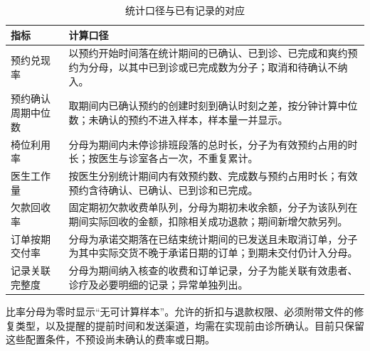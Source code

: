 \begin{table}[H]\centering\caption{统计口径与已有记录的对应}
\small\begin{tabularx}{\textwidth}{L{3.3cm}Y}
\toprule 指标 & 计算口径\\\midrule
预约兑现率 & 以预约开始时间落在统计期间的已确认、已到诊、已完成和爽约预约为分母，以其中已到诊或已完成数为分子；取消和待确认不纳入。\\
预约确认周期中位数 & 取期间内已确认预约的创建时刻到确认时刻之差，按分钟计算中位数；未确认的预约不进入样本，样本量一并显示。\\
椅位利用率 & 分母为期间内未停诊排班段落的总时长，分子为有效预约占用的时长；按医生与诊室各占一次，不重复累计。\\
医生工作量 & 按医生分别统计期间内有效预约数、完成数与预约占用时长；有效预约含待确认、已确认、已到诊和已完成。\\
欠款回收率 & 固定期初欠款收费单队列，分母为期初未收余额，分子为该队列在期间实际回收的金额，扣除相关成功退款；期间新增欠款另列。\\
订单按期交付率 & 分母为承诺交期落在已结束统计期间的已发送且未取消订单，分子为其中实际交货不晚于承诺日期的订单；到期未交付仍计入分母。\\
记录关联完整度 & 分母为期间纳入核查的收费和订单记录，分子为能关联有效患者、诊疗及必要明细的记录；异常单独列出。\\
\bottomrule\end{tabularx}\end{table}

比率分母为零时显示“无可计算样本”。允许的折扣与退款权限、必须附带文件的修复类型，以及提醒的提前时间和发送渠道，均需在实现前由诊所确认。目前只保留这些配置条件，不预设尚未确认的费率或日期。
